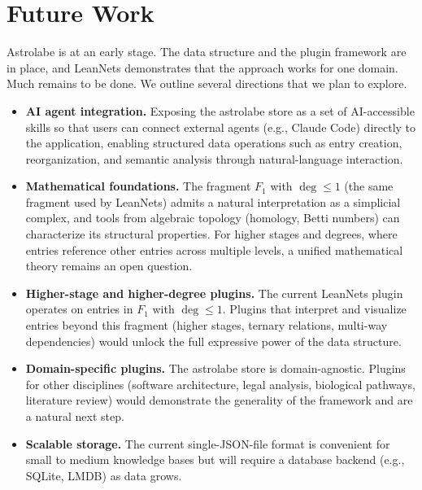 \section{Future Work}
\label{sec:conclusion}

Astrolabe is at an early stage. The data structure and the plugin framework are in place, and LeanNets demonstrates that the approach works for one domain. Much remains to be done. We outline several directions that we plan to explore.

\begin{itemize}
  \item \textbf{AI agent integration.} Exposing the astrolabe store as a set of AI-accessible skills so that users can connect external agents (e.g., Claude Code) directly to the application, enabling structured data operations such as entry creation, reorganization, and semantic analysis through natural-language interaction.

  \item \textbf{Mathematical foundations.} The fragment $F_1$ with $\deg \leq 1$ (the same fragment used by LeanNets) admits a natural interpretation as a simplicial complex, and tools from algebraic topology (homology, Betti numbers) can characterize its structural properties. For higher stages and degrees, where entries reference other entries across multiple levels, a unified mathematical theory remains an open question.

  \item \textbf{Higher-stage and higher-degree plugins.} The current LeanNets plugin operates on entries in $F_1$ with $\deg \leq 1$. Plugins that interpret and visualize entries beyond this fragment (higher stages, ternary relations, multi-way dependencies) would unlock the full expressive power of the data structure.

  \item \textbf{Domain-specific plugins.} The astrolabe store is domain-agnostic. Plugins for other disciplines (software architecture, legal analysis, biological pathways, literature review) would demonstrate the generality of the framework and are a natural next step.

  \item \textbf{Scalable storage.} The current single-JSON-file format is convenient for small to medium knowledge bases but will require a database backend (e.g., SQLite, LMDB) as data grows.
\end{itemize}
